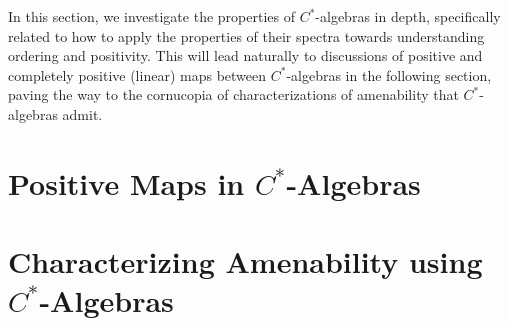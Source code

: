 In this section, we investigate the properties of $C^{\ast}$-algebras in depth, specifically related to how to apply the properties of their spectra towards understanding ordering and positivity. This will lead naturally to discussions of positive and completely positive (linear) maps between $C^{\ast}$-algebras in the following section, paving the way to the cornucopia of characterizations of amenability that $C^{\ast}$-algebras admit.
\section{Positive Maps in \texorpdfstring{$C^{\ast}$-Algebras}{C*-Algebras}}%

\section{Characterizing Amenability using \texorpdfstring{$C^{\ast}$-Algebras}{C*-Algebras}}%
